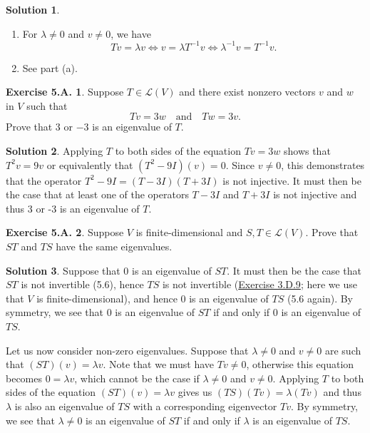 \documentclass[12pt]{article}
\theoremstyle{definition}
\theoremstyle{exercise}
\newtheorem{exercise}{Exercise 5.A.}
\theoremstyle{solution}
\newtheorem*{solution}{Solution}
\newcommand{\lmap}{\mathcal{L}}
\newcommand{\quand}{\quad \text{and} \quad}
\begin{document}
\begin{solution}
    \begin{enumerate}
        \item For \( \lambda \neq 0 \) and \( v \neq 0 \), we have
        \[
            Tv = \lambda v \iff v = \lambda T^{-1} v \iff \lambda^{-1}v = T^{-1}v.
        \]

        \item See part (a).
    \end{enumerate}
\end{solution}

\begin{exercise}
\label{ex:22}
    Suppose \( T \in \lmap(V) \) and there exist nonzero vectors \( v \) and \( w \) in \( V \) such that
    \[
        Tv = 3w \quand Tw = 3v.
    \]
    Prove that \( 3 \) or \( -3 \) is an eigenvalue of \( T \).
\end{exercise}

\begin{solution}
    Applying \( T \) to both sides of the equation \( Tv = 3w \) shows that \( T^2v = 9v \) or equivalently that \( (T^2 - 9I)(v) = 0 \). Since \( v \neq 0 \), this demonstrates that the operator \( T^2 - 9I = (T - 3I)(T + 3I) \) is not injective. It must then be the case that at least one of the operators \( T - 3I \) and \( T + 3I \) is not injective and thus 3 or -3 is an eigenvalue of \( T \).
\end{solution}

\begin{exercise}
\label{ex:23}
    Suppose \( V \) is finite-dimensional and \( S, T \in \lmap(V) \). Prove that \( ST \) and \( TS \) have the same eigenvalues.
\end{exercise}

\begin{solution}
    Suppose that 0 is an eigenvalue of \( ST \). It must then be the case that \( ST \) is not invertible (5.6), hence \( TS \) is not invertible (\href{https://lew98.github.io/Mathematics/LADR_Section_3_D_Exercises.pdf}{Exercise 3.D.9}; here we use that \( V \) is finite-dimensional), and hence 0 is an eigenvalue of \( TS \) (5.6 again). By symmetry, we see that 0 is an eigenvalue of \( ST \) if and only if 0 is an eigenvalue of \( TS \).

    Let us now consider non-zero eigenvalues. Suppose that \( \lambda \neq 0 \) and \( v \neq 0 \) are such that \( (ST)(v) = \lambda v \). Note that we must have \( Tv \neq 0 \), otherwise this equation becomes \( 0 = \lambda v \), which cannot be the case if \( \lambda \neq 0 \) and \( v \neq 0 \). Applying \( T \) to both sides of the equation \( (ST)(v) = \lambda v \) gives us \( (TS)(Tv) = \lambda (Tv) \) and thus \( \lambda \) is also an eigenvalue of \( TS \) with a corresponding eigenvector \( Tv \). By symmetry, we see that \( \lambda \neq 0 \) is an eigenvalue of \( ST \) if and only if \( \lambda \) is an eigenvalue of \( TS \).
\end{solution}
\end{document}
